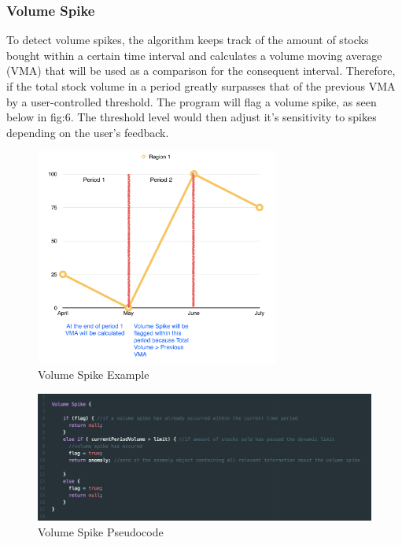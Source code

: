 \documentclass[12pt]{article}
\begin{document}
    \subsubsection{Volume Spike}
    To detect volume spikes, the algorithm keeps track of the amount of stocks bought within a certain time interval and calculates a volume moving average (VMA) that will be used as a comparison for the consequent interval. Therefore, if the total stock
    volume in a period greatly surpasses that of the previous VMA by a user-controlled threshold. The program will flag a volume spike, as seen below in fig:6. The threshold level would then adjust it's sensitivity to spikes depending on the user's feedback.
    \begin{figure}[H]
    \centering
    \includegraphics[width=80mm]{VSGraph.png}
    \caption{Volume Spike Example}
    \end{figure}
    \begin{figure}[H]
    \centering
    \includegraphics[width=150mm]{VSpseudo.png}
    \caption{Volume Spike Pseudocode}
    \end{figure}
\end{document}
